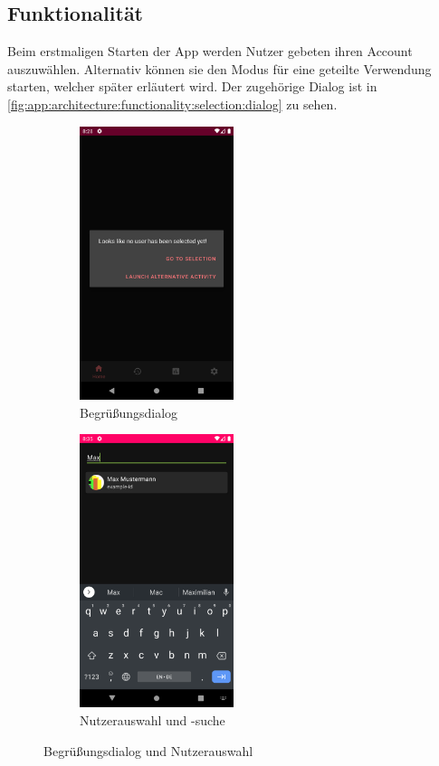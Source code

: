 \documentclass[a4paper, 11pt]{article}
\begin{document}
\subsection{Funktionalität}
\label{subsec:app:functionality}
Beim erstmaligen Starten der App werden Nutzer gebeten ihren Account auszuwählen.
Alternativ können sie den Modus für eine geteilte Verwendung starten, welcher später erläutert wird.
Der zugehörige Dialog ist in \autoref{fig:app:architecture:functionality:selection:dialog} zu sehen.
\begin{figure}[]
	\begin{subfigure}{.5\textwidth}
		\centering
			\includegraphics[height=8cm,keepaspectratio]{./images/screenshots/greetings-dialog.png}
		\caption{Begrüßungsdialog}
		\label{fig:app:architecture:functionality:selection:dialog}
	\end{subfigure}
	\begin{subfigure}{.5\textwidth}
		\centering
		\includegraphics[height=8cm,keepaspectratio]{./images/screenshots/user-search.png}
		\caption{Nutzerauswahl und -suche}
		\label{fig:app:architecture:functionality:selection:search}
	\end{subfigure}
	\caption{Begrüßungsdialog und Nutzerauswahl}
	\label{fig:app:architecture:functionality:selection}
\end{figure}
\end{document}
